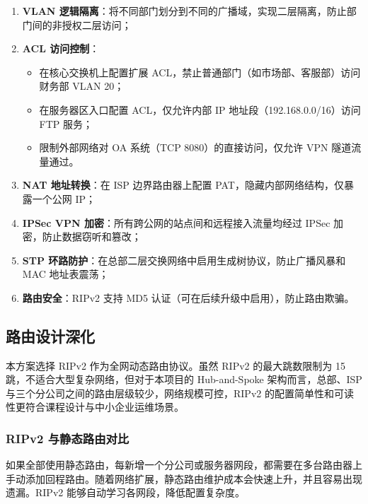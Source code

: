 \documentclass[12pt,a4paper]{ctexart}
\begin{document}
\begin{enumerate}[label=(\arabic*), leftmargin=2em]
    \item \textbf{VLAN 逻辑隔离}：将不同部门划分到不同的广播域，实现二层隔离，防止部门间的非授权二层访问；
    \item \textbf{ACL 访问控制}：
        \begin{itemize}
            \item 在核心交换机上配置扩展 ACL，禁止普通部门（如市场部、客服部）访问财务部 VLAN 20；
            \item 在服务器区入口配置 ACL，仅允许内部 IP 地址段（192.168.0.0/16）访问 FTP 服务；
            \item 限制外部网络对 OA 系统（TCP 8080）的直接访问，仅允许 VPN 隧道流量通过。
        \end{itemize}
    \item \textbf{NAT 地址转换}：在 ISP 边界路由器上配置 PAT，隐藏内部网络结构，仅暴露一个公网 IP；
    \item \textbf{IPSec VPN 加密}：所有跨公网的站点间和远程接入流量均经过 IPSec 加密，防止数据窃听和篡改；
    \item \textbf{STP 环路防护}：在总部二层交换网络中启用生成树协议，防止广播风暴和 MAC 地址表震荡；
    \item \textbf{路由安全}：RIPv2 支持 MD5 认证（可在后续升级中启用），防止路由欺骗。
\end{enumerate}

\subsection{路由设计深化}

本方案选择 RIPv2 作为全网动态路由协议。虽然 RIPv2 的最大跳数限制为 15 跳，不适合大型复杂网络，但对于本项目的 Hub-and-Spoke 架构而言，总部、ISP 与三个分公司之间的路由层级较少，网络规模可控，RIPv2 的配置简单性和可读性更符合课程设计与中小企业运维场景。

\subsubsection{RIPv2 与静态路由对比}

如果全部使用静态路由，每新增一个分公司或服务器网段，都需要在多台路由器上手动添加回程路由。随着网络扩展，静态路由维护成本会快速上升，并且容易出现遗漏。RIPv2 能够自动学习各网段，降低配置复杂度。
\end{document}
